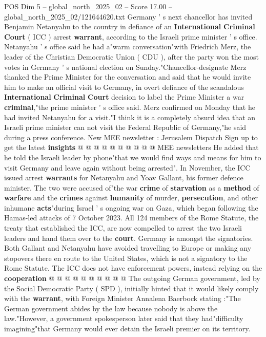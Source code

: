 \begin{textsample}{POS Dim 5 – global\_north\_2025\_02 – Score 17.00 – global\_north\_2025\_02/121644620.txt}  \label{ex:f5_pos_208}
Germany ' s next chancellor has invited Benjamin Netanyahu to the country in defiance of an \textbf{International} \textbf{Criminal} \textbf{Court} ( ICC ) arrest \textbf{warrant}, according to the Israeli prime minister ' s office.
Netanyahu ' s office said he had a"warm conversation"with Friedrich Merz, the leader of the Christian Democratic Union ( CDU ), after the party won the most votes in Germany ' s national election on Sunday."Chancellor-designate Merz thanked the Prime Minister for the conversation and said that he would invite him to make an official visit to Germany, in overt defiance of the scandalous \textbf{International} \textbf{Criminal} \textbf{Court} decision to label the Prime Minister a war \textbf{criminal},"the prime minister ' s office said.
Merz confirmed on Monday that he had invited Netanyahu for a visit."I think it is a completely absurd idea that an Israeli prime minister can not visit the Federal Republic of Germany,"he said during a press conference.
New MEE newsletter : Jerusalem Dispatch Sign up to get the latest \textbf{insights} @ @ @ @ @ @ @ @ @ @ MEE newsletters He added that he told the Israeli leader by phone"that we would find ways and means for him to visit Germany and leave again without being arrested".
In November, the ICC issued arrest \textbf{warrants} for Netanyahu and Yoav Gallant, his former defence minister.
The two were accused of"the war \textbf{crime} of \textbf{starvation} as a \textbf{method} of \textbf{warfare} and the \textbf{crimes} against \textbf{humanity} of murder, \textbf{persecution}, and other inhumane \textbf{acts}"during Israel ' s ongoing war on Gaza, which began following the Hamas-led attacks of 7 October 2023.
All 124 members of the Rome Statute, the treaty that established the ICC, are now compelled to arrest the two Israeli leaders and hand them over to the \textbf{court}.
Germany is amongst the signatories.
Both Gallant and Netanyahu have avoided travelling to Europe or making any stopovers there en route to the United States, which is not a signatory to the Rome Statute.
The ICC does not have enforcement powers, instead relying on the \textbf{cooperation} @ @ @ @ @ @ @ @ @ @ The outgoing German government, led by the Social Democratic Party ( SPD ), initially hinted that it would likely comply with the \textbf{warrant}, with Foreign Minister Annalena Baerbock stating :"The German government abides by the law because nobody is above the law."However, a government spokesperson later said that they had"difficulty imagining"that Germany would ever detain the Israeli premier on its territory.

\end{textsample}
